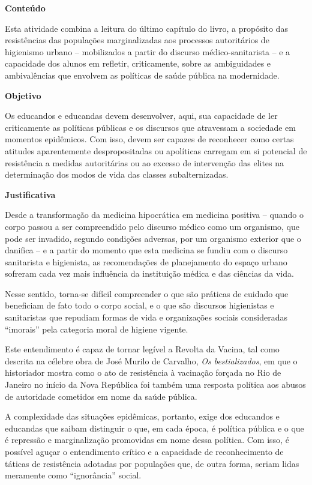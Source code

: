 \documentclass[12pt]{extarticle}
\begin{document}
\textbf{Conteúdo}

Esta atividade combina a leitura do último capítulo do livro, a
propósito das resistências das populações marginalizadas aos processos
autoritários de higienismo urbano -- mobilizados a partir do discurso
médico-sanitarista -- e a capacidade dos alunos em refletir,
criticamente, sobre as ambiguidades e ambivalências que envolvem as
políticas de saúde pública na modernidade.

\textbf{Objetivo}

Os educandos e educandas devem desenvolver, aqui, sua capacidade de ler
criticamente as políticas públicas e os discursos que atravessam a
sociedade em momentos epidêmicos. Com isso, devem ser capazes de
reconhecer como certas atitudes aparentemente despropositadas ou
apolíticas carregam em si potencial de resistência a medidas
autoritárias ou ao excesso de intervenção das elites na determinação dos
modos de vida das classes subalternizadas.

\textbf{Justificativa}

Desde a transformação da medicina hipocrática em medicina positiva --
quando o corpo passou a ser compreendido pelo discurso médico como um
organismo, que pode ser invadido, segundo condições adversas, por um
organismo exterior que o danifica -- e a partir do momento que esta
medicina se fundiu com o discurso sanitarista e higienista, as
recomendações de planejamento do espaço urbano sofreram cada vez mais
influência da instituição médica e das ciências da vida.

Nesse sentido, torna-se difícil compreender o que são práticas de
cuidado que beneficiam de fato todo o corpo social, e o que são
discursos higienistas e sanitaristas que repudiam formas de vida e
organizações sociais consideradas ``imorais'' pela categoria moral de
higiene vigente.

Este entendimento é capaz de tornar legível a Revolta da Vacina, tal
como descrita na célebre obra de José Murilo de Carvalho, \emph{Os
bestializados}, em que o historiador mostra como o ato de resistência à
vacinação forçada no Rio de Janeiro no início da Nova República foi
também uma resposta política aos abusos de autoridade cometidos em nome
da saúde pública.

A complexidade das situações epidêmicas, portanto, exige dos educandos e
educandas que saibam distinguir o que, em cada época, é política pública
e o que é repressão e marginalização promovidas em nome dessa política.
Com isso, é possível aguçar o entendimento crítico e a capacidade de
reconhecimento de táticas de resistência adotadas por populações que, de
outra forma, seriam lidas meramente como ``ignorância'' social.
\end{document}
